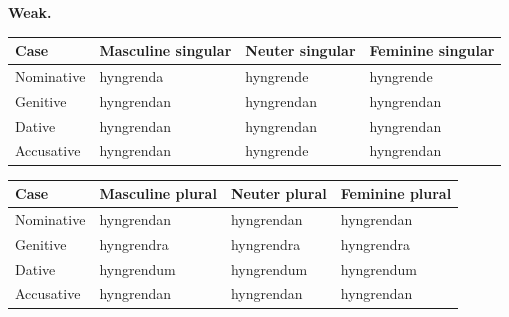 \par\endgroup

\textbf{Weak.}

\par\begingroup
\fontsize{10.5}{13.2}\selectfont
\setlength{\LTleft}{0pt}\setlength{\LTright}{\fill}
\noindent
\begin{tabular}{@{}>{\raggedright\arraybackslash}p{22.0mm}>{\raggedright\arraybackslash}p{31.188mm}>{\raggedright\arraybackslash}p{31.188mm}>{\raggedright\arraybackslash}p{31.188mm}@{}}
\toprule
\textbf{Case} & \textbf{Masculine singular} & \textbf{Neuter singular} & \textbf{Feminine singular} \\
\midrule
Nominative & hyngrenda & hyngrende & hyngrende \\
Genitive & hyngrendan & hyngrendan & hyngrendan \\
Dative & hyngrendan & hyngrendan & hyngrendan \\
Accusative & hyngrendan & hyngrende & hyngrendan \\
\bottomrule
\end{tabular}
\par\endgroup
\par\addvspace{5pt}
\par\begingroup
\fontsize{10.5}{13.2}\selectfont
\setlength{\LTleft}{0pt}\setlength{\LTright}{\fill}
\noindent
\begin{tabular}{@{}>{\raggedright\arraybackslash}p{22.0mm}>{\raggedright\arraybackslash}p{31.188mm}>{\raggedright\arraybackslash}p{31.188mm}>{\raggedright\arraybackslash}p{31.188mm}@{}}
\toprule
\textbf{Case} & \textbf{Masculine plural} & \textbf{Neuter plural} & \textbf{Feminine plural} \\
\midrule
Nominative & hyngrendan & hyngrendan & hyngrendan \\
Genitive & hyngrendra & hyngrendra & hyngrendra \\
Dative & hyngrendum & hyngrendum & hyngrendum \\
Accusative & hyngrendan & hyngrendan & hyngrendan \\
\bottomrule
\end{tabular}
\par\endgroup

